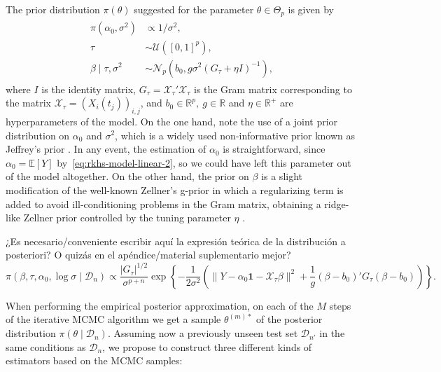 \documentclass[ba]{imsart}
\numberwithin{equation}{section}
\theoremstyle{plain}
\newcommand{\R}{\mathbb{R}}
\newcommand{\E}{\mathbb{E}}
\newenvironment{comment}
{
\noindent \em \color{red}
}
{
\color{black}
}
\begin{document}
The prior distribution \(\pi(\theta)\) suggested for the parameter \(\theta \in \Theta_p\) is given by
\begin{align}\label{eq:prior-linear}
  \begin{split}
  \pi(\alpha_0, \sigma^2)              & \propto 1/\sigma^2,                                                     \\
  \tau                     & \sim \mathcal U([0, 1]^p),                                              \\
  \beta\mid \tau, \sigma^2 & \sim \mathcal N_p(b_0, g\sigma^2(G_\tau + \eta I)^{-1}),
\end{split}
\end{align}
where \(I\) is the identity matrix, \(G_\tau = \mathcal X_\tau'\mathcal X_\tau\) is the Gram matrix corresponding to the matrix \(\mathcal X_\tau = (X_i(t_j))_{i,j}\), and \(b_0\in \R^p, \ g \in \R\) and \(\eta \in \R^+\) are hyperparameters of the model. On the one hand, note the use of a joint prior distribution on \(\alpha_0\) and \(\sigma^2\), which is a widely used non-informative prior known as Jeffrey's prior \citep{jeffreys1946invariant}. In any event, the estimation of \(\alpha_0\) is straightforward, since \(\alpha_0 = \E[Y]\) by~\eqref{eq:rkhs-model-linear-2}, so we could have left this parameter out of the model altogether. On the other hand, the prior on \(\beta\) is a slight modification of the well-known Zellner's g-prior \citep{zellner1986assessing} in which a regularizing term is added to avoid ill-conditioning problems in the Gram matrix, obtaining a ridge-like Zellner prior controlled by the tuning parameter \(\eta\) \citep{baragatti2012study}.

\begin{comment}
¿Es necesario/conveniente escribir aquí la expresión teórica de la distribución a posteriori? O quizás en el apéndice/material suplementario mejor?
\[
\pi(\beta, \tau, \alpha_0, \log\sigma\mid \mathcal D_n) \propto \frac{|G_\tau|^{1/2}}{\sigma^{p+n}} \exp\left\{ -\frac{1}{2\sigma^2} \left(\|Y- \alpha_0\boldsymbol{1} - \mathcal X_\tau\beta\|^2 + \frac{1}{g}(\beta - b_0)'G_\tau(\beta - b_0) \right) \right\}.
\]

\end{comment}

When performing the empirical posterior approximation, on each of the \(M\) steps of the iterative MCMC algorithm we get a sample \(\theta^{(m)*}\) of the posterior distribution \(\pi(\theta\mid \mathcal D_n)\). Assuming now a previously unseen test set \(\mathcal D_{n'}\) in the same conditions as \(\mathcal D_n\), we propose to construct three different kinds of estimators based on the MCMC samples:
\end{document}

